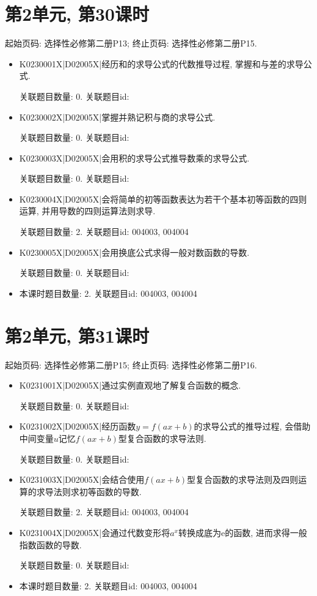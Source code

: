 \section*{第2单元, 第30课时}
起始页码: 选择性必修第二册P13; 终止页码: 选择性必修第二册P15.
\begin{itemize}
\item K0230001X|D02005X|经历和的求导公式的代数推导过程, 掌握和与差的求导公式.

关联题目数量: 0. 关联题目id: 

\item K0230002X|D02005X|掌握并熟记积与商的求导公式.

关联题目数量: 0. 关联题目id: 

\item K0230003X|D02005X|会用积的求导公式推导数乘的求导公式.

关联题目数量: 0. 关联题目id: 

\item K0230004X|D02005X|会将简单的初等函数表达为若干个基本初等函数的四则运算, 并用导数的四则运算法则求导.

关联题目数量: 2. 关联题目id: 004003, 004004

\item K0230005X|D02005X|会用换底公式求得一般对数函数的导数.

关联题目数量: 0. 关联题目id: 

\item 本课时题目数量: 2. 关联题目id: 004003, 004004

\end{itemize}

\section*{第2单元, 第31课时}
起始页码: 选择性必修第二册P15; 终止页码: 选择性必修第二册P16.
\begin{itemize}
\item K0231001X|D02005X|通过实例直观地了解复合函数的概念.

关联题目数量: 0. 关联题目id: 

\item K0231002X|D02005X|经历函数$y=f(ax+b)$的求导公式的推导过程, 会借助中间变量$u$记忆$f(ax+b)$型复合函数的求导法则.

关联题目数量: 0. 关联题目id: 

\item K0231003X|D02005X|会结合使用$f(ax+b)$型复合函数的求导法则及四则运算的求导法则求初等函数的导数.

关联题目数量: 2. 关联题目id: 004003, 004004

\item K0231004X|D02005X|会通过代数变形将$a^x$转换成底为$\mathrm{e}$的函数, 进而求得一般指数函数的导数.

关联题目数量: 0. 关联题目id: 

\item 本课时题目数量: 2. 关联题目id: 004003, 004004

\end{itemize}

